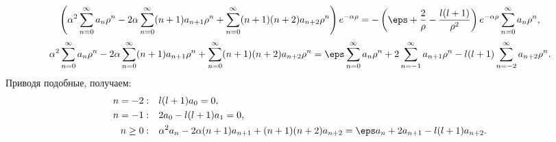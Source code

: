 \[
	\left( \alpha^2 \sum_{n=0}^{\infty} a_n\rho^n -
	2\alpha\sum_{n=0}^{\infty} (n+1)a_{n+1}\rho^n +
	\sum_{n=0}^{\infty} (n+1)(n+2)a_{n+2}\rho^n \right)e^{-\alpha\rho}
	= - \left(\eps + \frac{2}{\rho} - \frac{l(l+1)}{\rho^2}\right)
	e^{-\alpha\rho}\sum_{n=0}^{\infty} a_n\rho^n,
\]
\[
	\alpha^2 \sum_{n=0}^{\infty} a_n\rho^n -
	2\alpha\sum_{n=0}^{\infty} (n+1)a_{n+1}\rho^n +
	\sum_{n=0}^{\infty} (n+1)(n+2)a_{n+2}\rho^n =
	\eps\sum_{n=0}^{\infty} a_n\rho^n +
	2\sum_{n=-1}^{\infty} a_{n+1}\rho^n -
	l(l+1)\sum_{n=-2}^{\infty} a_{n+2}\rho^n.
\]
Приводя подобные, получаем:
\begin{align*}
	n=-2:&\quad l(l+1)a_0 = 0,\\
	n=-1:&\quad 2a_0 - l(l+1)a_1 = 0,\\
	n\ge0:&\quad \alpha^2 a_n - 2\alpha(n+1)a_{n+1}+
	(n+1)(n+2)a_{n+2} = \eps a_n +
	2 a_{n+1} - l(l+1)a_{n+2}.
\end{align*}